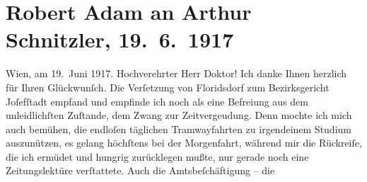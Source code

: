 

         
         \renewcommand{\erwaehntePersonen}{Personen: Robert Adam, Richard Beer, Alexandre père Dumas, Aemilius Hacker, Viktor Franz Patzner, Maria Pollak}
         \renewcommand{\erwaehnteInstitutionen}{Institutionen: Bezirksgericht Wien Josefstadt}
         \renewcommand{\erwaehnteOrte}{Orte: Steiermark, VIII., Josefstadt, Wien, XXI., Floridsdorf, Zistersdorf}
         \renewcommand{\erwaehnteWerke}{Werke: Das Ende des Judas, Meine Memoiren}
               \section[Robert Adam an Arthur Schnitzler, 19. 6. 1917]{ Robert Adam an Arthur Schnitzler, 19. 6. 1917}\nopagebreak{}\rehead{ }\begin{ledgroupsized}[t]{13cm}\normalsize\beginnumbering{} \toendnotes[C]{\smallbreak\pagebreak[2]} 
\toendnotes[C]{\smallbreak}\pstart
           \raggedleft{}{\pb}Wien, am 19. Juni 1917. \pend
           \pstart{}Hochverehrter Herr Doktor!\pend\pstart
           Ich danke Ihnen herzlich für Ihren Glückwunſch. Die Verſetzung von Floridsdorf zum Bezirksgericht Joſefſtadt empfand und empfinde ich noch als eine Befreiung aus dem unleidlichſten
               Zuſtande, dem Zwang zur Zeitvergeudung. Denn mochte ich mich auch bemühen, die
               endloſen täglichen Tramwayfahrten zu irgendeinem Studium auszunützen, es gelang
               höchſtens bei der Morgenfahrt, während mir die Rückreiſe, die ich ermüdet und hungrig
               zurücklegen mußte, nur gerade noch eine Zeitungslektüre {\pb}verſtattete. Auch die Amtsbeſchäftigung – die

\end{ledgroupsized}
